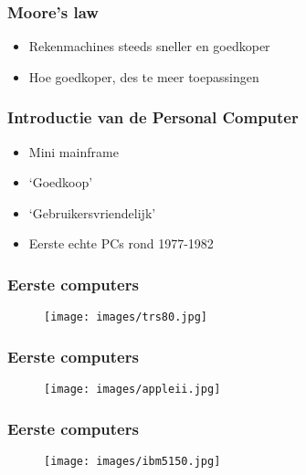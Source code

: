 \documentclass[aspectratio=43]{uva-inf-presentation}
\begin{document}

\begin{frame}
\frametitle{Moore's law}

\begin{itemize}
\item Rekenmachines steeds sneller en goedkoper
\item Hoe goedkoper, des te meer toepassingen
\end{itemize}

\end{frame}


\begin{frame}
\frametitle{Introductie van de Personal Computer}

\begin{itemize}
\item Mini mainframe
\item `Goedkoop'
\item `Gebruikersvriendelijk'
\item Eerste echte PCs rond 1977-1982
\end{itemize}

\end{frame}


\begin{frame}
\frametitle{Eerste computers}

\begin{figure}
\texttt{[image: images/trs80.jpg]}
\end{figure}

\end{frame}


\begin{frame}
\frametitle{Eerste computers}

\begin{figure}
\texttt{[image: images/appleii.jpg]}
\end{figure}

\end{frame}


\begin{frame}
\frametitle{Eerste computers}

\begin{figure}
\texttt{[image: images/ibm5150.jpg]}
\end{figure}

\end{frame}
\end{document}
